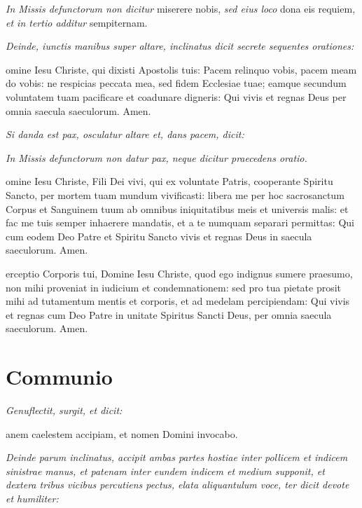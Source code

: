 \textit{In Missis defunctorum non dicitur} miserere nobis, \textit{sed eius
loco} dona eis requiem, \textit{et in tertio additur} sempiternam.

\divisio

\textit{%
    Deinde, iunctis manibus super altare, inclinatus dicit secrete sequentes
    orationes:
}

omine Iesu Christe, qui dixisti Apostolis tuis: Pacem relinquo
vobis, pacem meam do vobis: ne respicias peccata mea, sed fidem Ecclesiae tuae;
eamque secundum voluntatem tuam pacificare et coadunare digneris: Qui vivis et
regnas Deus per omnia saecula saeculorum.  Amen.

\textit{Si danda est pax, osculatur altare et, dans pacem, dicit:}


\divisio

\textit{In Missis defunctorum non datur pax, neque dicitur praecedens oratio.}

\divisio

omine Iesu Christe, Fili Dei vivi, qui ex voluntate Patris,
cooperante Spiritu Sancto, per mortem tuam mundum vivificasti: libera me per hoc
sacrosanctum Corpus et Sanguinem tuum ab omnibus iniquitatibus meis et universis
malis: et fac me tuis semper inhaerere mandatis, et a te numquam separari
permittas: Qui cum eodem Deo Patre et Spiritu Sancto vivis et regnas Deus in
saecula saeculorum.  Amen.

erceptio Corporis tui, Domine Iesu Christe, quod ego indignus
sumere praesumo, non mihi proveniat in iudicium et condemnationem: sed pro tua
pietate prosit mihi ad tutamentum mentis et corporis, et ad medelam
percipiendam: Qui vivis et regnas cum Deo Patre in unitate Spiritus Sancti Deus,
per omnia saecula saeculorum.  Amen.

\section{Communio}

\textit{Genuflectit, surgit, et dicit:}

anem caelestem accipiam, et nomen Domini invocabo.

\textit{%
    Deinde parum inclinatus, accipit ambas partes hostiae inter pollicem et
    indicem sinistrae manus, et patenam inter eundem indicem et medium supponit,
    et dextera tribus vicibus percutiens pectus, elata aliquantulum voce, ter
    dicit devote et humiliter:
}

